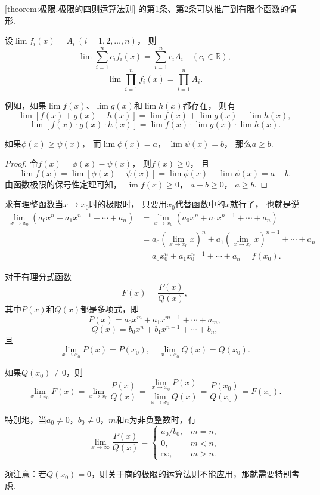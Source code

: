 \cref{theorem:极限.极限的四则运算法则} 的第1条、第2条可以推广到有限个函数的情形.
\begin{corollary}
设\(\lim f_i(x) = A_i\ (i=1,2,\dotsc,n)\)，
则\[
	\lim \sum_{i=1}^n c_i f_i(x) = \sum_{i=1}^n c_i A_i
	\quad(c_i\in\mathbb{R}),
\]\[
	\lim \prod_{i=1}^n f_i(x) = \prod_{i=1}^n A_i.
\]
\end{corollary}
例如，如果\(\lim f(x)\)、\(\lim g(x)\)和\(\lim h(x)\)都存在，
则有\[
	\lim[f(x) + g(x) - h(x)] = \lim f(x) + \lim g(x) - \lim h(x),
\]\[
	\lim[f(x) \cdot g(x) \cdot h(x)] = \lim f(x) \cdot \lim g(x) \cdot \lim h(x).
\]

\begin{theorem}
如果\(\phi(x) \geq \psi(x)\)，
而\(\lim \phi(x)=a\)，
\(\lim \psi(x)=b\)，
那么\(a \geq b\).
\begin{proof}
令\(f(x) = \phi(x) - \psi(x)\)，
则\(f(x) \geq 0\)，
且\[
	\lim f(x) = \lim[\phi(x) - \psi(x)]
	= \lim \phi(x) - \lim \psi(x)
	= a - b.
\]
由函数极限的保号性定理可知，
\(\lim f(x) \geq 0\)，
\(a - b \geq 0\)，
\(a \geq b\).
\end{proof}
\end{theorem}

\begin{example}\label{example:极限.有理整函数在一点的极限}
求有理整函数当\(x\to x_0\)时的极限时，
只要用\(x_0\)代替函数中的\(x\)就行了，
也就是说
\def\lx{\left(\lim_{x \to x_0} x\right)}
\begin{align*}
	\lim_{x \to x_0} (a_0 x^n + a_1 x^{n-1} + \dotsb + a_n)
	&= \lim_{x \to x_0}{(a_0 x^n + a_1 x^{n-1} + \dotsb + a_n)} \\
	&= a_0 \lx^n + a_1 \lx^{n-1} + \dotsb + a_n \\
	&= a_0 x_0^n + a_1 x_0^{n-1} + \dotsb + a_n
	= f(x_0).
\end{align*}
\end{example}

\begin{example}
对于有理分式函数\[
F(x) = \frac{P(x)}{Q(x)},
\]其中\(P(x)\)和\(Q(x)\)都是多项式，即\[
P(x) = a_0 x^m + a_1 x^{m-1} + \dotsb + a_m,
\]\[
Q(x) = b_0 x^n + b_1 x^{n-1} + \dotsb + b_n,
\]且\[
\lim_{x \to x_0} P(x) = P(x_0),
\quad
\lim_{x \to x_0} Q(x) = Q(x_0).
\]

如果\(Q(x_0) \neq 0\)，则\[
\lim_{x \to x_0} F(x)
= \lim_{x \to x_0} \frac{P(x)}{Q(x)}
= \frac{\lim_{x \to x_0} P(x)}{\lim_{x \to x_0} Q(x)}
= \frac{P(x_0)}{Q(x_0)}
= F(x_0).
\]

特别地，当\(a_0\neq0\)，\(b_0\neq0\)，\(m\)和\(n\)为非负整数时，有
\[
\lim_{x\to\infty}\frac{P(x)}{Q(x)} = \left\{ \begin{array}{cl}
a_0/b_0, & m=n, \\
0, & m<n, \\
\infty, & m>n.
\end{array} \right.
\]
\end{example}
须注意：若\(Q(x_0) = 0\)，则关于商的极限的运算法则不能应用，那就需要特别考虑.

